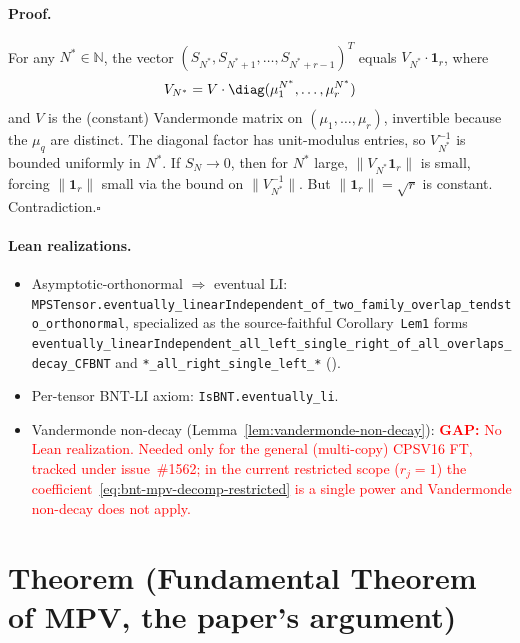 \documentclass{article}
\newcommand{\leanid}[1]{\texttt{#1}}
\newcommand{\gap}[1]{\textcolor{red}{\textbf{GAP:} #1}}
\theoremstyle{plain}
\begin{document}
\paragraph{Proof.}
For any $N^* \in \mathbb{N}$, the vector
$(S_{N^*}, S_{N^*+1}, \ldots, S_{N^* + r - 1})^T$ equals $V_{N^*}
    \cdot \mathbf{1}_r$, where
\begin{align}
    V_{N^*} = V \cdot \diag(\mu_1^{N^*}, \ldots, \mu_r^{N^*})
\end{align}
and $V$ is the (constant) Vandermonde matrix on $(\mu_1, \ldots, \mu_r)$,
invertible because the $\mu_q$ are distinct. The diagonal factor has
unit-modulus entries, so $V_{N^*}^{-1}$ is bounded uniformly in $N^*$.
If $S_N \to 0$, then for $N^*$ large, $\|V_{N^*} \mathbf{1}_r\|$ is
small, forcing $\|\mathbf{1}_r\|$ small via the bound on
$\|V_{N^*}^{-1}\|$. But $\|\mathbf{1}_r\| = \sqrt{r}$ is constant.
Contradiction.\hfill$\square$

\paragraph{Lean realizations.}
\begin{itemize}
    \item Asymptotic-orthonormal $\Rightarrow$ eventual LI:
          \leanid{MPSTensor.eventually\_linearIndependent\_of\_two\_family\_overlap\_tendsto\_orthonormal},
          specialized as the source-faithful Corollary~\texttt{Lem1}
          forms \leanid{eventually\_linearIndependent\_all\_left\_single\_right\_of\_all\_overlaps\_decay\_CFBNT}
          and \leanid{*\_all\_right\_single\_left\_*}
          ().
    \item Per-tensor BNT-LI axiom: \leanid{IsBNT.eventually\_li}.
    \item Vandermonde non-decay (Lemma~\ref{lem:vandermonde-non-decay}):
          \gap{No Lean realization. Needed only for the general
              (multi-copy) CPSV16 FT, tracked under issue~\#1562; in
              the current restricted scope ($r_j = 1$) the
              coefficient~\eqref{eq:bnt-mpv-decomp-restricted} is a
              single power and Vandermonde non-decay does not apply.}
\end{itemize}

\section{Theorem (Fundamental Theorem of MPV, the paper's argument)}
\label{sec:fundamental-theorem}
\end{document}
